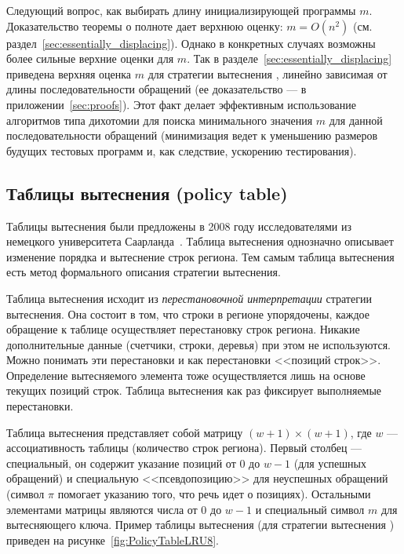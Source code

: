 Следующий вопрос, как выбирать длину инициализирующей программы $m$. %
Доказательство теоремы о полноте дает верхнюю оценку: $m = O(n^2)$ (см. раздел~\ref{sec:essentially_displacing}). Однако в конкретных случаях возможны более сильные верхние оценки для $m$. Так в разделе~\ref{sec:essentially_displacing} приведена верхняя оценка $m$ для стратегии вытеснения \LRU, линейно зависимая от длины последовательности обращений (ее доказательство --- в приложении~\ref{sec:proofs}). Этот факт делает эффективным использование алгоритмов типа дихотомии для поиска минимального значения $m$ для данной последовательности обращений (минимизация ведет к уменьшению размеров будущих тестовых программ и, как следствие, ускорению тестирования).

\subsection{Таблицы вытеснения (policy table)}

Таблицы вытеснения были предложены в 2008 году исследователями из немецкого университета Саарланда~\cite{policy_tables}. Таблица вытеснения однозначно описывает изменение порядка и вытеснение строк региона. Тем самым таблица вытеснения есть метод формального описания стратегии вытеснения.

Таблица вытеснения исходит из \emph{перестановочной интерпретации} стратегии
вытеснения. Она состоит в том, что строки в регионе упорядочены, каждое
обращение к таблице осуществляет перестановку строк региона.
Никакие дополнительные данные (счетчики, строки, деревья) при этом не используются. Можно понимать эти перестановки и как перестановки <<позиций строк>>.
Определение вытесняемого элемента тоже осуществляется лишь на основе текущих
позиций строк. Таблица вытеснения как раз фиксирует выполняемые перестановки.

Таблица вытеснения представляет собой матрицу $(w{+}1) \times (w{+}1)$, где $w$
--- ассоциативность таблицы (количество строк региона). Первый столбец ---
специальный, он содержит указание позиций от 0 до $w{-}1$ (для успешных обращений) и специальную <<псевдопозицию>> для неуспешных обращений (символ $\pi$ помогает
указанию того, что речь идет о позициях). Остальными элементами
матрицы являются числа от 0 до $w{-}1$ и специальный символ $m$ для
вытесняющего ключа. Пример таблицы вытеснения (для стратегии
вытеснения \LRU) приведен на рисунке~\ref{fig:PolicyTableLRU8}.

